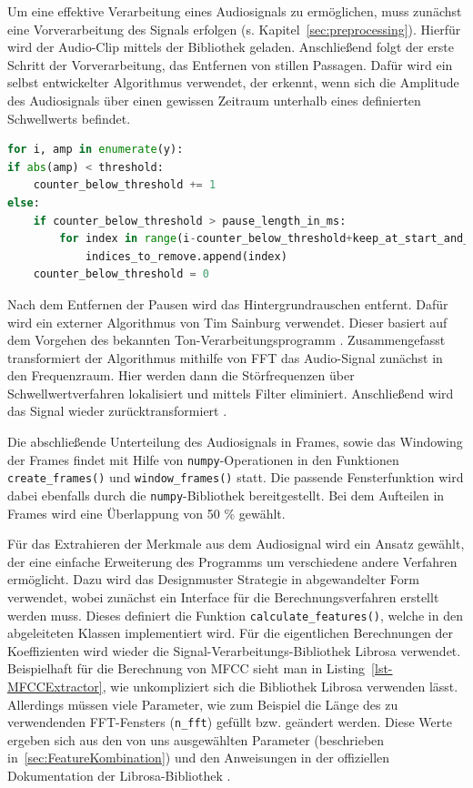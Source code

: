 Um eine effektive Verarbeitung eines Audiosignals zu ermöglichen, muss zunächst eine Vorverarbeitung des Signals erfolgen (s. Kapitel~\ref{sec:preprocessing}).
Hierfür wird der Audio-Clip mittels der Bibliothek  geladen.
Anschließend folgt der erste Schritt der Vorverarbeitung, das Entfernen von stillen Passagen.
Dafür wird ein selbst entwickelter Algorithmus verwendet, der erkennt, wenn sich die Amplitude des Audiosignals über einen gewissen Zeitraum unterhalb eines definierten Schwellwerts befindet.

\begin{lstlisting}[language=Python,caption=Remove Silence,label=lst-remove-silence]
for i, amp in enumerate(y):
if abs(amp) < threshold:
    counter_below_threshold += 1
else:
    if counter_below_threshold > pause_length_in_ms:
        for index in range(i-counter_below_threshold+keep_at_start_and_end, i-keep_at_start_and_end):
            indices_to_remove.append(index)
    counter_below_threshold = 0
\end{lstlisting}

Nach dem Entfernen der Pausen wird das Hintergrundrauschen entfernt.
Dafür wird ein externer Algorithmus von Tim Sainburg verwendet.
Dieser basiert auf dem Vorgehen des bekannten Ton-Verarbeitungsprogramm .
Zusammengefasst transformiert der Algorithmus mithilfe von \ac{FFT} das Audio-Signal zunächst in den Frequenzraum.
Hier werden dann die Störfrequenzen über Schwellwertverfahren lokalisiert und mittels Filter eliminiert.
Anschließend wird das Signal wieder zurücktransformiert \autocite[][]{sainburg_timsainbnoisereduce_2019}.

Die abschließende Unterteilung des Audiosignals in Frames, sowie das Windowing der Frames findet mit Hilfe von \texttt{numpy}-Operationen in den Funktionen \texttt{create\_\-frames()} und \texttt{window\_\-frames()} statt.
Die passende Fensterfunktion wird dabei ebenfalls durch die \texttt{numpy}-Bibliothek bereitgestellt.
Bei dem Aufteilen in Frames wird eine Überlappung von 50 \% gewählt.

Für das Extrahieren der Merkmale aus dem Audiosignal wird ein Ansatz gewählt, der eine einfache Erweiterung des Programms um verschiedene andere Verfahren ermöglicht.
Dazu wird das Designmuster Strategie in abgewandelter Form verwendet, wobei zunächst ein Interface für die Berechnungsverfahren erstellt werden muss.
Dieses definiert die Funktion \texttt{calculate\_features()}, welche in den abgeleiteten Klassen implementiert wird.
Für die eigentlichen Berechnungen der Koeffizienten wird wieder die Signal-Verarbeitungs-Bibliothek Librosa verwendet.
Beispielhaft für die Berechnung von \ac{MFCC} sieht man in Listing~\ref{lst-MFCCExtractor}, wie unkompliziert sich die Bibliothek Librosa verwenden lässt.
Allerdings müssen viele Parameter, wie zum Beispiel die Länge des zu verwendenden FFT-Fensters (\texttt{n\_fft}) gefüllt bzw. geändert werden.
Diese Werte ergeben sich aus den von uns ausgewählten Parameter (beschrieben in~\ref{sec:FeatureKombination}) und den Anweisungen in der offiziellen Dokumentation der Librosa-Bibliothek \autocite[vgl. ][]{librosa_development_team_librosa_2023}.

